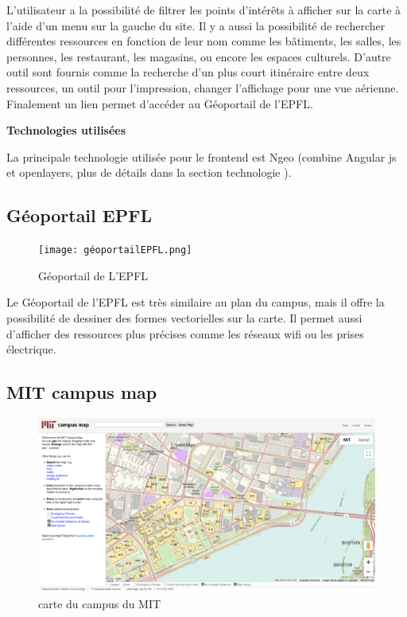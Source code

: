 \documentclass[
    iai, %
    il, %
]{heig-tb}
\begin{document}
L'utilisateur a la possibilité de filtrer les points d'intérêts à afficher sur la carte à l'aide d'un menu sur la gauche du site.
Il y a aussi la possibilité de rechercher différentes ressources en fonction de leur nom comme les bâtiments, les salles, les personnes, les restaurant, les magasins, ou encore les espaces culturels.
D'autre outil sont fournis comme la recherche d'un plus court itinéraire entre deux ressources, un outil pour l'impression, changer l'affichage pour une vue aérienne.
Finalement un lien permet d'accéder au Géoportail de l'EPFL.

\textbf{Technologies utilisées}

La principale technologie utilisée pour le frontend est Ngeo (combine Angular js et openlayers, plus de détails dans la section technologie ).

\subsection{Géoportail EPFL}

\begin{figure}[H]
    \caption{Géoportail de L'EPFL}
    \centering
    \texttt{[image: géoportailEPFL.png]}
\end{figure}

Le Géoportail de l'EPFL \cite{geoportail-epfl} est très similaire au plan du campus, mais il offre la possibilité de dessiner des formes vectorielles sur la carte.
Il permet aussi d'afficher des ressources plus précises comme les réseaux wifi ou les prises électrique.

\subsection{MIT campus map}

\begin{figure}[H]
    \caption{carte du campus du MIT}
    \centering
    \includegraphics{MitCampusMap.png}
\end{figure}
\end{document}
